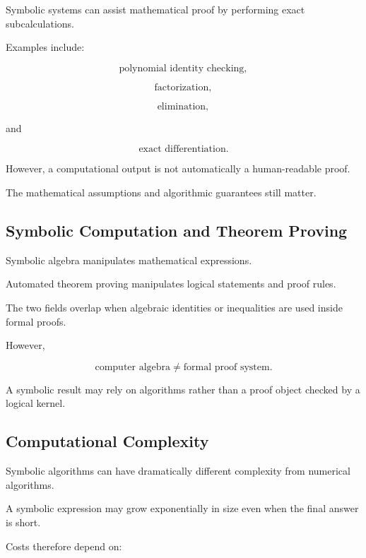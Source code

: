 Symbolic systems can assist mathematical proof by performing exact
subcalculations.

Examples include:

\[
\boxed{
\text{polynomial identity checking},
}
\]

\[
\boxed{
\text{factorization},
}
\]

\[
\boxed{
\text{elimination},
}
\]

and

\[
\boxed{
\text{exact differentiation}.
}
\]

However, a computational output is not automatically a human-readable
proof.

The mathematical assumptions and algorithmic guarantees still matter.

\subsection{Symbolic Computation and Theorem Proving}
\label{subsec:symbolic-computation-theorem-proving}

Symbolic algebra manipulates mathematical expressions.

Automated theorem proving manipulates logical statements and proof rules.

The two fields overlap when algebraic identities or inequalities are used
inside formal proofs.

However,

\[
\boxed{
\text{computer algebra}
\neq
\text{formal proof system}.
}
\]

A symbolic result may rely on algorithms rather than a proof object checked
by a logical kernel.

\subsection{Computational Complexity}
\label{subsec:symbolic-complexity}

Symbolic algorithms can have dramatically different complexity from
numerical algorithms.

A symbolic expression may grow exponentially in size even when the final
answer is short.

Costs therefore depend on:

